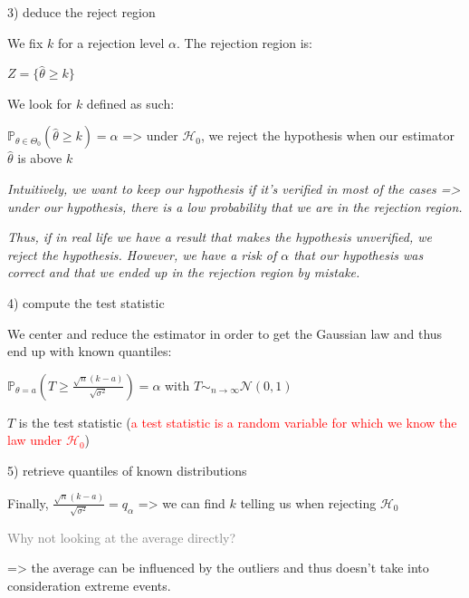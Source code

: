3) deduce the reject region

\vspace{5mm}

We fix $k$ for a rejection level $\alpha$. The rejection region is:

$Z=\{\widehat{\theta} \ge k\}$

\vspace{5mm}

We look for $k$ defined as such:

$\mathbb{P}_{\theta \in \Theta_0}(\widehat{\theta} \ge k)=\alpha$ => under $\mathcal{H}_0$, we reject the hypothesis when our estimator $\widehat{\theta}$ is above $k$

\textit{Intuitively, we want to keep our hypothesis if it's verified in most of the cases => under our hypothesis, there is a low probability that we are in the rejection region.}

\textit{Thus, if in real life we have a result that makes the hypothesis unverified, we reject the hypothesis. However, we have a risk of $\alpha$ that our hypothesis was correct and that we ended up in the rejection region by mistake.}

\vspace{5mm}

4) compute the test statistic

\vspace{5mm}

We center and reduce the estimator in order to get the Gaussian law and thus end up with known quantiles:

$\mathbb{P}_{\theta = a}(T \ge \frac{\sqrt{n} (k-a)}{\sqrt{\sigma^2}})=\alpha$ with $T \sim_{n \to \infty} \mathcal{N}(0,1)$

$T$ is the test statistic (\textcolor{red}{a test statistic is a random variable for which we know the law under $\mathcal{H}_0$})

\vspace{5mm}

5) retrieve quantiles of known distributions

\vspace{5mm}

Finally, $\frac{\sqrt{n} (k-a)}{\sqrt{\sigma^2}}=q_\alpha$ => we can find $k$ telling us when rejecting $\mathcal{H}_0$

\vspace{5mm}

\textcolor{gray}{Why not looking at the average directly?}

=> the average can be influenced by the outliers and thus doesn't take into consideration extreme events.


